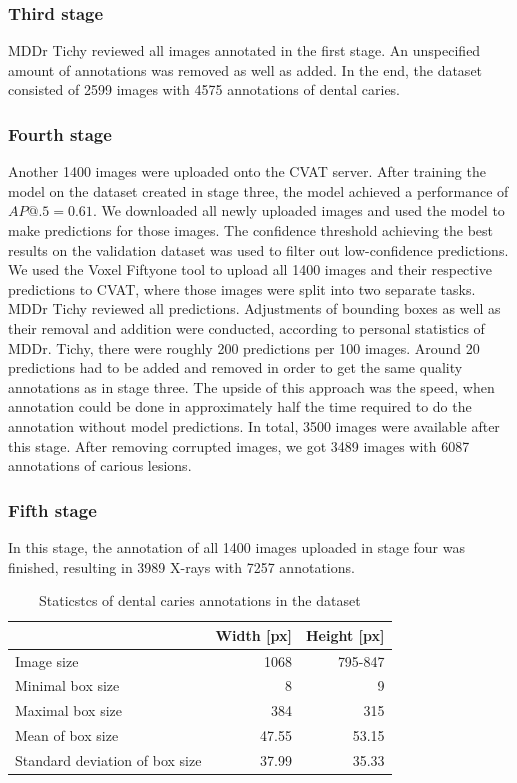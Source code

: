 \subsubsection{Third stage}
MDDr Tichy reviewed all images annotated in the first stage. An unspecified amount of annotations was removed as well as added. In the end, the dataset consisted of 2599 images with 4575 annotations of dental caries.

\subsubsection{Fourth stage}
Another 1400 images were uploaded onto the CVAT server. After training the model on the dataset created in stage three, the model achieved a performance of $AP@.5=0.61$. We downloaded all newly uploaded images and used the model to make predictions for those images. The confidence threshold achieving the best results on the validation dataset was used to filter out low-confidence predictions. We used the Voxel Fiftyone tool to upload all 1400 images and their respective predictions to CVAT, where those images were split into two separate tasks.
MDDr Tichy reviewed all predictions. Adjustments of bounding boxes as well as their removal and addition were conducted, according to personal statistics of MDDr. Tichy, there were roughly 200 predictions per 100 images. Around 20 predictions had to be added and removed in order to get the same quality annotations as in stage three. The upside of this approach was the speed, when annotation could be done in approximately half the time required to do the annotation without model predictions. In total, 3500 images were available after this stage. After removing corrupted images, we got 3489 images with 6087 annotations of carious lesions.

\subsubsection{Fifth stage}
In this stage, the annotation of all 1400 images uploaded in stage four was finished, resulting in 3989 X-rays with 7257 annotations.

\begin{table}
    \centering
    \begin{tabular}{l|r|r}
                                       & Width [px] & Height [px] \\\hline
        Image size                     & 1068       & 795-847     \\ \hline
        Minimal box size               & 8          & 9           \\ \hline
        Maximal box size               & 384        & 315         \\ \hline
        Mean of box size               & 47.55      & 53.15       \\ \hline
        Standard deviation of box size & 37.99      & 35.33       \\ \hline
    \end{tabular}
    \caption{\label{tab:dataset_statistics}Staticstcs of dental caries annotations in the dataset}
\end{table}

